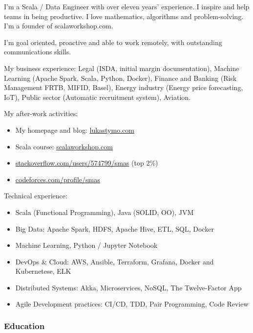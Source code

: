 \documentclass[]{rss}
\date{}
\providecommand{\tightlist}{%
  \setlength{\itemsep}{0pt}\setlength{\parskip}{0pt}}
\begin{document}
\address{\\[-9pt] lukas@codeily.com | lukastymo.com}
\begin{resume}

I'm a Scala / Data Engineer with over eleven years' experience. I
inspire and help teams in being productive. I love mathematics,
algorithms and problem-solving. I'm a founder of scalaworkshop.com.

I'm goal oriented, proactive and able to work remotely, with outstanding
communications skills.

My business experience: Legal (ISDA, initial margin documentation),
Machine Learning (Apache Spark, Scala, Python, Docker), Finance and
Banking (Risk Management FRTB, MIFID, Basel), Energy industry (Energy
price forecasting, IoT), Public sector (Automatic recruitment system),
Aviation.

My after-work activities:

\begin{itemize}
\tightlist
\item
  My homepage and blog: \href{https://lukastymo.com}{lukastymo.com}
\item
  Scala course: \href{https://scalaworkshop.com}{scalaworkshop.com}
\item
  \href{https://stackoverflow.com/users/574799/smas}{stackoverflow.com/users/574799/smas}
  (top 2\%)
\item
  \href{https://codeforces.com/profile/smas}{codeforces.com/profile/smas}
\end{itemize}

Technical experience:

\begin{itemize}
\tightlist
\item
  Scala (Functional Programming), Java (SOLID, OO), JVM
\item
  Big Data: Apache Spark, HDFS, Apache Hive, ETL, SQL, Docker
\item
  Machine Learning, Python / Jupyter Notebook
\item
  DevOps \& Cloud: AWS, Ansible, Terraform, Grafana, Docker and
  Kubernetese, ELK
\item
  Distributed Systems: Akka, Microservices, NoSQL, The Twelve-Factor App
\item
  Agile Development practices: CI/CD, TDD, Pair Programming, Code Review
\end{itemize}

\hypertarget{education}{%
\subsubsection{Education}\label{education}}


\end{resume}
\end{document}

